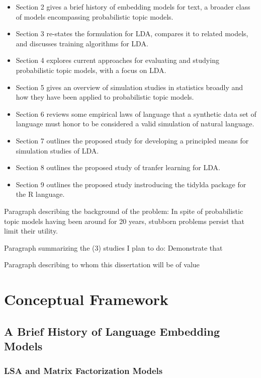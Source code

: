 \documentclass[conference,final,]{IEEEtran}
\providecommand{\tightlist}{%
  \setlength{\itemsep}{0pt}\setlength{\parskip}{0pt}}
\begin{document}
\begin{itemize}
\tightlist
\item
  Section 2 gives a brief history of embedding models for text, a
  broader class of models encompassing probabilistic topic models.
\item
  Section 3 re-states the formulation for LDA, compares it to related
  models, and discusses training algorithms for LDA.
\item
  Section 4 explores current approaches for evaluating and studying
  probabilistic topic models, with a focus on LDA.
\item
  Section 5 gives an overview of simulation studies in statistics
  broadly and how they have been applied to probabilistic topic models.
\item
  Section 6 reviews some empirical laws of language that a synthetic
  data set of language must honor to be considered a valid simulation of
  natural language.
\item
  Section 7 outlines the proposed study for developing a principled
  means for simulation studies of LDA.
\item
  Section 8 outlines the proposed study of tranfer learning for LDA.
\item
  Section 9 outlines the proposed study instroducing the tidylda package
  for the R language.
\end{itemize}

Paragraph describing the background of the problem: In spite of
probabilistic topic models having been around for 20 years, stubborn
problems persist that limit their utility.

Paragraph summarizing the (3) studies I plan to do: Demonstrate that

Paragraph describing to whom this dissertation will be of value

\hypertarget{conceptual-framework}{%
\section{Conceptual Framework}\label{conceptual-framework}}

\hypertarget{a-brief-history-of-language-embedding-models}{%
\subsection{A Brief History of Language Embedding
Models}\label{a-brief-history-of-language-embedding-models}}

\hypertarget{lsa-and-matrix-factorization-models}{%
\subsubsection{LSA and Matrix Factorization
Models}\label{lsa-and-matrix-factorization-models}}
\end{document}
